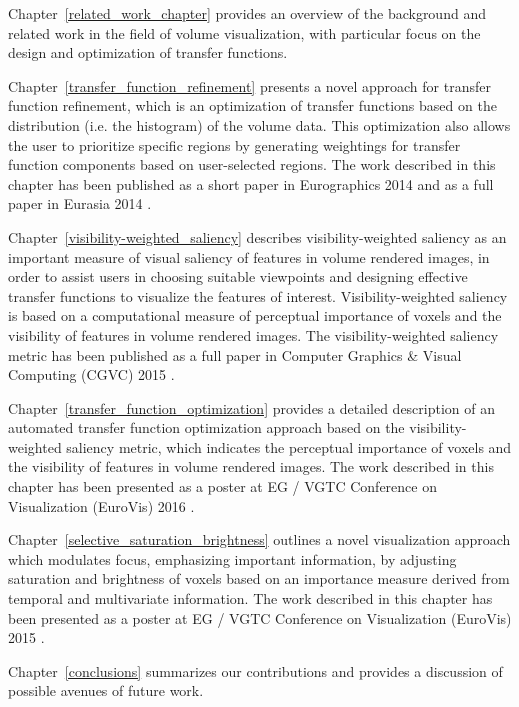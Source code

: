 Chapter~\ref{related_work_chapter}
provides an overview of the background and related work in the field of volume visualization, with particular focus on the design and optimization of transfer functions.

Chapter~\ref{transfer_function_refinement}
presents a novel approach for transfer function refinement, which is an optimization of transfer functions based on the distribution (i.e. the histogram) of the volume data. This optimization also allows the user to prioritize specific regions by generating weightings for transfer function components based on user-selected regions. The work described in this chapter has been published as a short paper in Eurographics 2014 \cite{luo_information-guided_2014} and as a full paper in Eurasia 2014 \cite{shengzhou_luo_transfer_2014}.

Chapter~\ref{visibility-weighted_saliency}
describes visibility-weighted saliency as an important measure of visual saliency of features in volume rendered images, in order to assist users in choosing suitable viewpoints and designing effective transfer functions to visualize the features of interest. Visibility-weighted saliency is based on a computational measure of perceptual importance of voxels and the visibility of features in volume rendered images. The visibility-weighted saliency metric has been published as a full paper in Computer Graphics \& Visual Computing (CGVC) 2015 \cite{luo_visibility-weighted_2015}.

Chapter~\ref{transfer_function_optimization}
provides a detailed description of an automated transfer function optimization approach based on the visibility-weighted saliency metric, which indicates the perceptual importance of voxels and the visibility of features in volume rendered images.
The work described in this chapter has been presented as a poster at EG / VGTC Conference on Visualization (EuroVis) 2016 \cite{luo_transfer_2016}.

Chapter~\ref{selective_saturation_brightness}
outlines a novel visualization approach which modulates focus, emphasizing important information, by adjusting saturation and brightness of voxels based on an importance measure derived from temporal and multivariate information.
The work described in this chapter has been presented as a poster at EG / VGTC Conference on Visualization (EuroVis) 2015 \cite{shengzhou_luo_selective_2015}.

Chapter~\ref{conclusions}
summarizes our contributions and provides a discussion of possible avenues of future work.

%
%

